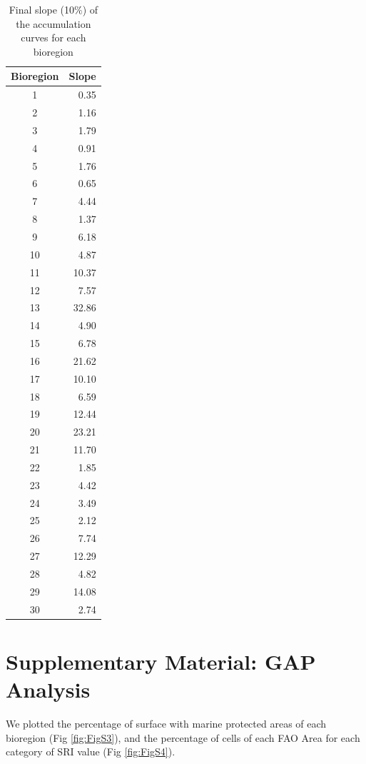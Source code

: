 \documentclass[12pt,authoryear]{elsarticle}
\providecommand{\DIFaddbeginFL}{} %
\providecommand{\DIFaddendFL}{} %
\begin{document}
\begin{table}[h]
\centering
\begin{tabular}{| c | r |}
  \hline
\textbf{Bioregion} & \textbf{Slope} \\ 
  \hline
  \DIFaddbeginFL \hline
\DIFaddendFL 1 & 0.35 \\ 
2 & 1.16 \\ 
3 & 1.79 \\ 
4 & 0.91 \\ 
5 & 1.76 \\ 
6 & 0.65 \\ 
7 & 4.44 \\ 
8 & 1.37 \\ 
9 & 6.18 \\ 
10 & 4.87 \\ 
11 & 10.37 \\ 
12 & 7.57 \\ 
13 & 32.86 \\ 
14 & 4.90 \\ 
15 & 6.78 \\ 
16 & 21.62 \\ 
17 & 10.10 \\ 
18 & 6.59 \\ 
19 & 12.44 \\ 
20 & 23.21 \\ 
21 & 11.70 \\ 
22 & 1.85 \\ 
23 & 4.42 \\ 
24 & 3.49 \\ 
25 & 2.12 \\ 
26 & 7.74 \\ 
27 & 12.29 \\ 
28 & 4.82 \\ 
29 & 14.08 \\ 
30 & 2.74 \\ 
  \DIFaddbeginFL \hline
   \DIFaddendFL \hline
\end{tabular}
\caption{Final slope (10$\%$) of the accumulation curves for each bioregion}
\label{tab:slope}
\end{table}

\section{Supplementary Material: GAP Analysis}
We plotted the percentage of surface with marine protected areas of each bioregion (Fig \ref{fig:FigS3}), and the percentage of cells of each FAO Area for each category of SRI value (Fig \ref{fig:FigS4}).
\end{document}
